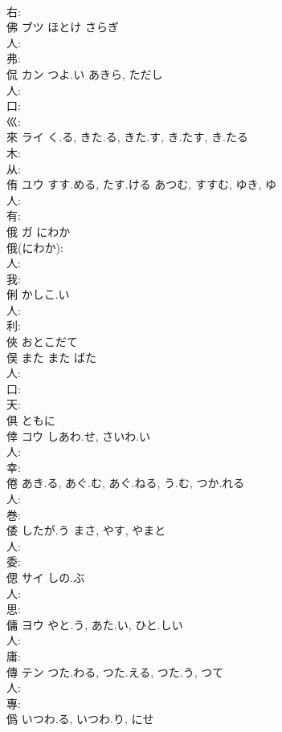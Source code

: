 \documentclass[8pt]{extreport}
\begin{document}
\begin{CJK}{UTF8}{min}
\\	右: 
\\	佛	ブツ	ほとけ	さらぎ	
\\	人: 
\\	弗: 
\\	侃	カン	つよ.い	あきら, ただし	
\\	人: 
\\	口: 
\\	巛: 
\\	來	ライ	く.る, きた.る, きた.す, き.たす, き.たる		
\\	木: 
\\	从: 
\\	侑	ユウ	すす.める, たす.ける	あつむ, すすむ, ゆき, ゆ	
\\	人: 
\\	有: 
\\	俄	ガ	にわか		
\\	俄(にわか): 
\\	人: 
\\	我: 
\\	俐		かしこ.い				
\\	人: 
\\	利: 
\\	俠		おとこだて				
\\	俣	また	また	ばた	
\\	人: 
\\	口: 
\\	天: 
\\	俱		ともに				
\\	倖	コウ	しあわ.せ, さいわ.い		
\\	人: 
\\	幸: 
\\	倦		あき.る, あぐ.む, あぐ.ねる, う.む, つか.れる			
\\	人: 
\\	巻: 
\\	倭		したが.う	まさ, やす, やまと		
\\	人: 
\\	委: 
\\	偲	サイ	しの.ぶ		
\\	人: 
\\	思: 
\\	傭	ヨウ	やと.う, あた.い, ひと.しい		
\\	人: 
\\	庸: 
\\	傳	テン	つた.わる, つた.える, つた.う, つて				
\\	人: 
\\	專: 
\\	僞		いつわ.る, いつわ.り, にせ				

\end{CJK}
\end{document}
